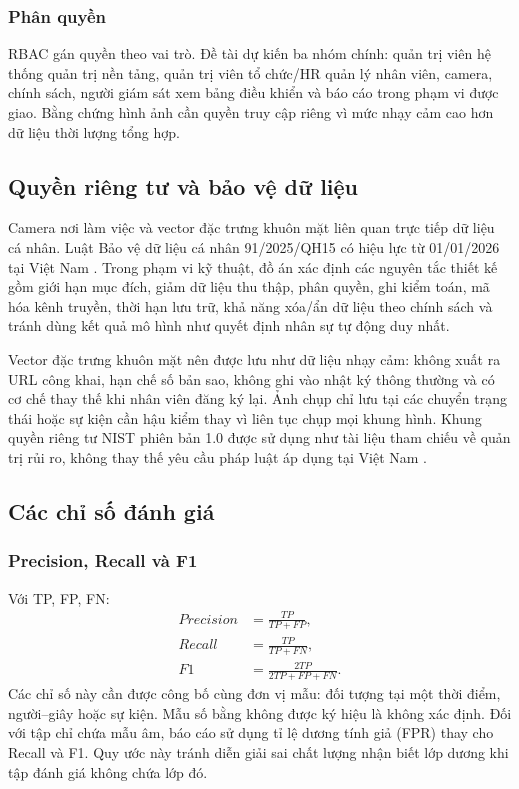 \subsubsection{Phân quyền}
RBAC gán quyền theo vai trò. Đề tài dự kiến ba nhóm chính: quản trị viên hệ thống quản trị nền tảng, quản trị viên tổ chức/HR quản lý nhân viên, camera, chính sách, người giám sát xem bảng điều khiển và báo cáo trong phạm vi được giao. Bằng chứng hình ảnh cần quyền truy cập riêng vì mức nhạy cảm cao hơn dữ liệu thời lượng tổng hợp.

\subsection{Quyền riêng tư và bảo vệ dữ liệu}
Camera nơi làm việc và vector đặc trưng khuôn mặt liên quan trực tiếp dữ liệu cá nhân. Luật Bảo vệ dữ liệu cá nhân 91/2025/QH15 có hiệu lực từ 01/01/2026 tại Việt Nam \cite{vnprivacy}. Trong phạm vi kỹ thuật, đồ án xác định các nguyên tắc thiết kế gồm giới hạn mục đích, giảm dữ liệu thu thập, phân quyền, ghi kiểm toán, mã hóa kênh truyền, thời hạn lưu trữ, khả năng xóa/ẩn dữ liệu theo chính sách và tránh dùng kết quả mô hình như quyết định nhân sự tự động duy nhất.

Vector đặc trưng khuôn mặt nên được lưu như dữ liệu nhạy cảm: không xuất ra URL công khai, hạn chế số bản sao, không ghi vào nhật ký thông thường và có cơ chế thay thế khi nhân viên đăng ký lại. Ảnh chụp chỉ lưu tại các chuyển trạng thái hoặc sự kiện cần hậu kiểm thay vì liên tục chụp mọi khung hình. Khung quyền riêng tư NIST phiên bản 1.0 được sử dụng như tài liệu tham chiếu về quản trị rủi ro, không thay thế yêu cầu pháp luật áp dụng tại Việt Nam \cite{nistprivacy}.

\subsection{Các chỉ số đánh giá}
\subsubsection{Precision, Recall và F1}
Với TP, FP, FN:
\begin{align}
 Precision &= \frac{TP}{TP+FP},\\
 Recall &= \frac{TP}{TP+FN},\\
 F1 &= \frac{2TP}{2TP+FP+FN}.
\end{align}
Các chỉ số này cần được công bố cùng đơn vị mẫu: đối tượng tại một thời điểm, người--giây hoặc sự kiện. Mẫu số bằng không được ký hiệu là không xác định. Đối với tập chỉ chứa mẫu âm, báo cáo sử dụng tỉ lệ dương tính giả (FPR) thay cho Recall và F1. Quy ước này tránh diễn giải sai chất lượng nhận biết lớp dương khi tập đánh giá không chứa lớp đó.

